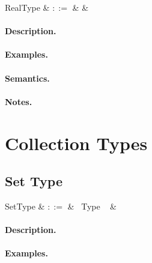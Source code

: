 \begin{syntax}
  RealType & $::=$ &  &\\
\end{syntax}

\paragraph{Description.}

\paragraph{Examples.}

\paragraph{Semantics.}

\paragraph{Notes.} 


\section{Collection Types}


\subsection{Set Type}

\begin{syntax}
  SetType & $::=$ & \token{\{} \ Type \ \token{\}} &\\
\end{syntax}

\paragraph{Description.}

\paragraph{Examples.}

